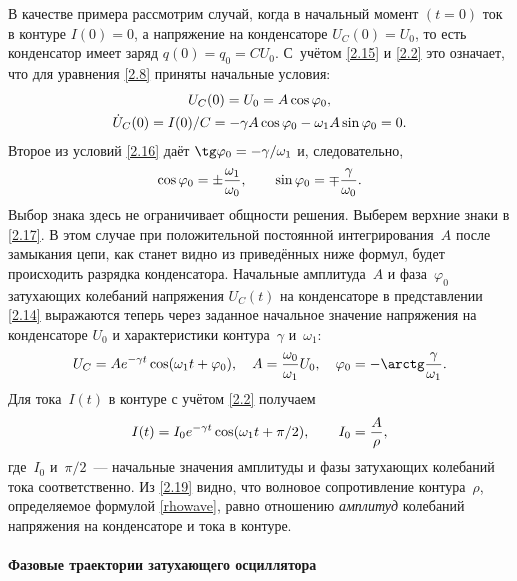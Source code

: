 В качестве примера 
рассмотрим случай, когда в начальный момент $(t=0)$ ток в
контуре $I(0)=0$, а напряжение на конденсаторе $U_C(0)=U_0$, то есть
конденсатор имеет заряд $q(0)=q_0=CU_0$. С~учётом \eqref{2.15} и \eqref{2.2}
это означает, что для уравнения \eqref{2.8} приняты начальные условия:
\begin{equation}
	\eqmark{2.16}
		\begin{gathered}[c]
			U_C(0)=U_0=A \cos\varphi_0, \\
			\dot{U}_C(0)=I(0)/C=-\gamma
A \cos\varphi_0-\omega_1A \sin\varphi_0=0.
		\end{gathered}
\end{equation}
Второе из условий \eqref{2.16} даёт $\tg\varphi_0=-\gamma/\omega_1$
и, следовательно,
\begin{equation}\eqmark{2.17}
\cos\varphi_0=\pm\frac{\omega_1}{\omega_0}, \qquad 
\sin\varphi_0=\mp\frac{\gamma}{\omega_0}.
\end{equation}
Выбор знака здесь не ограничивает общности решения. Выберем верхние знаки в
\eqref{2.17}. В этом случае при положительной постоянной интегрирования~$A$
после замыкания цепи, как станет видно из приведённых ниже формул, будет
происходить разрядка конденсатора. Начальные амплитуда~$A$ и фаза~$\varphi_0$
затухающих колебаний напряжения $U_C(t)$ на конденсаторе в представлении
\eqref{2.14} выражаются теперь через заданное начальное значение напряжения на
конденсаторе $U_0$ и характеристики контура~$\gamma$ и~$\omega_1$:
\begin{equation}\eqmark{2.18}
U_C=A e^{-\gamma t}\cos(\omega_1t+\varphi_0), \quad
A =\frac{\omega_0}{\omega_1}U_0, \quad 
\varphi_0=-\arctg \frac{\gamma}{\omega_1}.
\end{equation}
Для тока~$I(t)$ в контуре с учётом \eqref{2.2} получаем 
\begin{equation}\eqmark{2.19}
I(t)=I_0 e^{-\gamma t}\cos(\omega_1t+\pi/2), \qquad I_0=\frac{A}{\rho},
\end{equation}
где~$I_0$ и~$\pi/2$~--- начальные значения амплитуды и фазы
затухающих колебаний тока соответственно.
Из \eqref{2.19} видно, что волновое сопротивление контура~$\rho$, 
определяемое формулой \eqref{rhowave},
равно отношению \emph{амплитуд} колебаний напряжения на конденсаторе и тока
 в контуре.

\paragraph{Фазовые траектории затухающего осциллятора}

